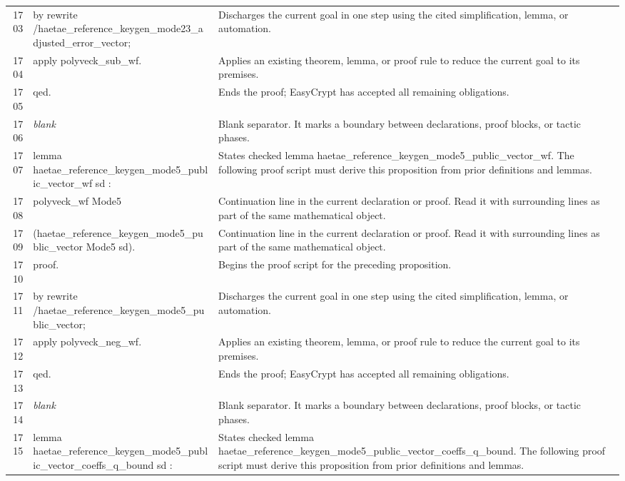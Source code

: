 \documentclass[10pt]{article}
\begin{document}
\begin{longtable}{r L{0.53\textwidth} L{0.37\textwidth}}
1703 & {\ttfamily\scriptsize by rewrite /haetae\_reference\_keygen\_mode23\_adjusted\_error\_vector;} & Discharges the current goal in one step using the cited simplification, lemma, or automation. \\
1704 & {\ttfamily\scriptsize    apply polyveck\_sub\_wf.} & Applies an existing theorem, lemma, or proof rule to reduce the current goal to its premises. \\
1705 & {\ttfamily\scriptsize qed.} & Ends the proof; EasyCrypt has accepted all remaining obligations. \\
1706 & {\ttfamily\scriptsize \emph{blank}} & Blank separator.  It marks a boundary between declarations, proof blocks, or tactic phases. \\
1707 & {\ttfamily\scriptsize lemma haetae\_reference\_keygen\_mode5\_public\_vector\_wf sd :} & States checked lemma haetae\_reference\_keygen\_mode5\_public\_vector\_wf.  The following proof script must derive this proposition from prior definitions and lemmas. \\
1708 & {\ttfamily\scriptsize   polyveck\_wf Mode5} & Continuation line in the current declaration or proof.  Read it with surrounding lines as part of the same mathematical object. \\
1709 & {\ttfamily\scriptsize     (haetae\_reference\_keygen\_mode5\_public\_vector Mode5 sd).} & Continuation line in the current declaration or proof.  Read it with surrounding lines as part of the same mathematical object. \\
1710 & {\ttfamily\scriptsize proof.} & Begins the proof script for the preceding proposition. \\
1711 & {\ttfamily\scriptsize by rewrite /haetae\_reference\_keygen\_mode5\_public\_vector;} & Discharges the current goal in one step using the cited simplification, lemma, or automation. \\
1712 & {\ttfamily\scriptsize    apply polyveck\_neg\_wf.} & Applies an existing theorem, lemma, or proof rule to reduce the current goal to its premises. \\
1713 & {\ttfamily\scriptsize qed.} & Ends the proof; EasyCrypt has accepted all remaining obligations. \\
1714 & {\ttfamily\scriptsize \emph{blank}} & Blank separator.  It marks a boundary between declarations, proof blocks, or tactic phases. \\
1715 & {\ttfamily\scriptsize lemma haetae\_reference\_keygen\_mode5\_public\_vector\_coeffs\_q\_bound sd :} & States checked lemma haetae\_reference\_keygen\_mode5\_public\_vector\_coeffs\_q\_bound.  The following proof script must derive this proposition from prior definitions and lemmas. \\

\end{longtable}
\end{document}

